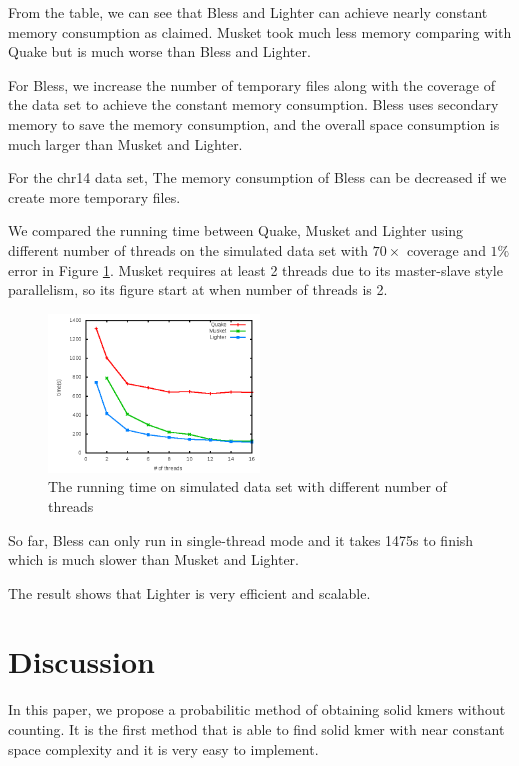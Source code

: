 \documentclass[10pt]{article}
\begin{document}
From the table, we can see that Bless and Lighter can achieve nearly constant memory consumption as claimed. Musket took much less memory comparing with Quake but is much worse than Bless and Lighter.

For Bless, we increase the number of temporary files along with the coverage of the data set to achieve the constant memory consumption. Bless uses secondary memory to save the memory consumption, and the overall space consumption is much larger than Musket and Lighter. 

For the chr14 data set, The memory consumption of Bless can be decreased if we create more temporary files. 

We compared the running time between Quake, Musket and Lighter using different number of threads on the simulated data set with $70\times$ coverage and $1\%$ error in Figure \ref{fig:runtime}. Musket requires at least 2 threads due to its master-slave style parallelism, so its figure start at when number of threads is 2. 

\begin{figure}[h!]
\begin{center}
\includegraphics[width=0.5\textwidth]{runtime.png}
\end{center}
\caption{The running time on simulated data set with different number of threads\label{fig:runtime}}
\end{figure}

So far, Bless can only run in single-thread mode and it takes 1475s to finish which is much slower than Musket and Lighter.

The result shows that Lighter is very efficient and scalable. 

\section*{Discussion}
In this paper, we propose a probabilitic method of obtaining solid kmers without counting. It is the first method that is able to find solid kmer with near constant space complexity and it is very easy to implement.
\end{document}
